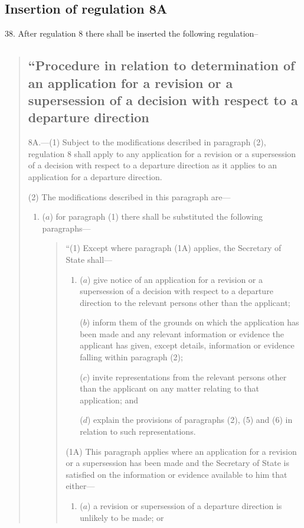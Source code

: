 \documentclass[12pt,a4paper]{article}
\begin{document}
\subsection[38. Insertion of regulation 8A]{Insertion of regulation 8A}

38.  After regulation 8 there shall be inserted the following regulation–
\begin{quotation}
\subsection*{“Procedure in relation to determination of an application for a revision or a supersession of a decision with respect to a departure direction}

8A.—(1) Subject to the modifications described in paragraph (2), regulation 8 shall apply to any application for a revision or a supersession of a decision with respect to a departure direction as it applies to an application for a departure direction.

(2) The modifications described in this paragraph are---
\begin{enumerate}\item[]
($a$) for paragraph (1) there shall be substituted the following paragraphs---
\begin{quotation}
“(1) Except where paragraph (1A) applies, the Secretary of State shall---
\begin{enumerate}\item[]
($a$) give notice of an application for a revision or a supersession of a decision with respect to a departure direction to the relevant persons other than the applicant;

($b$) inform them of the grounds on which the application has been made and any relevant information or evidence the applicant has given, except details, information or evidence falling within paragraph (2);

($c$) invite representations from the relevant persons other than the applicant on any matter relating to that application; and

($d$) explain the provisions of paragraphs (2), (5) and (6) in relation to such representations.
\end{enumerate}

(1A) This paragraph applies where an application for a revision or a supersession has been made and the Secretary of State is satisfied on the information or evidence available to him that either---
\begin{enumerate}\item[]
($a$) a revision or supersession of a departure direction is unlikely to be made; or


\end{enumerate}
\end{quotation}
\end{enumerate}
\end{quotation}
\end{document}
